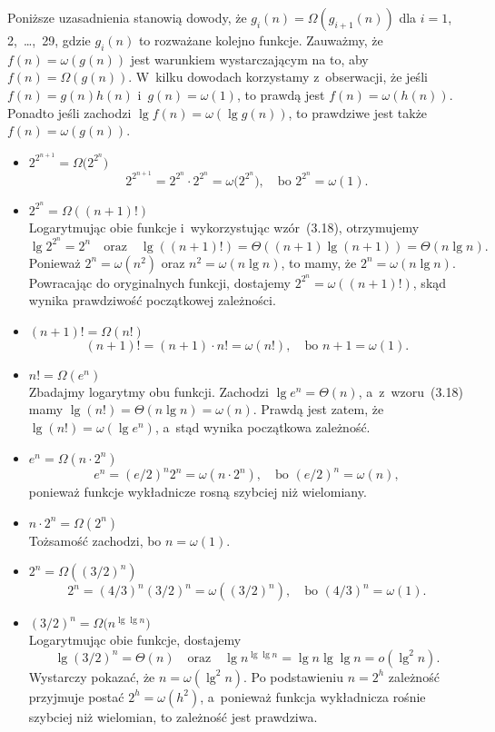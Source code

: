 
\subproblem %
Poniższe uzasadnienia stanowią dowody, że $g_i(n)=\Omega(g_{i+1}(n))$ dla $i=1$, 2,~\dots,~29, gdzie $g_i(n)$ to rozważane kolejno funkcje. Zauważmy, że $f(n)=\omega(g(n))$ jest warunkiem wystarczającym na to, aby $f(n)=\Omega(g(n))$. W~kilku dowodach korzystamy z~obserwacji, że jeśli $f(n)=g(n)h(n)$ i~$g(n)=\omega(1)$, to prawdą jest $f(n)=\omega(h(n))$. Ponadto jeśli zachodzi $\lg f(n)=\omega(\lg g(n))$, to prawdziwe jest także $f(n)=\omega(g(n))$.
\begin{itemize}
\item $2^{2^{n+1}}=\Omega\bigl(2^{2^n}\bigr)$
	\[
		2^{2^{n+1}} = 2^{2^n}\cdot2^{2^n} = \omega\bigl(2^{2^n}\bigr), \quad\text{bo $2^{2^n} = \omega(1)$}.
	\]
\item $2^{2^n}=\Omega((n+1)!)$ \\
	Logarytmując obie funkcje i~wykorzystując wzór~(3.18), otrzymujemy
	\[
		\lg 2^{2^n} = 2^n \quad\text{oraz}\quad \lg((n+1)!) = \Theta((n+1)\lg(n+1)) = \Theta(n\lg n).
	\]
	Ponieważ $2^n=\omega(n^2)$ oraz $n^2=\omega(n\lg n)$, to mamy, że $2^n=\omega(n\lg n)$. Powracając do oryginalnych funkcji, dostajemy $2^{2^n}=\omega((n+1)!)$, skąd wynika prawdziwość początkowej zależności.
\item $(n+1)!=\Omega(n!)$
	\[
		(n+1)! = (n+1)\cdot n! = \omega(n!), \quad\text{bo $n+1 = \omega(1)$}.
	\]
\item $n!=\Omega(e^n)$ \\
	Zbadajmy logarytmy obu funkcji. Zachodzi $\lg e^n=\Theta(n)$, a~z~wzoru~(3.18) mamy $\lg(n!)=\Theta(n\lg n)=\omega(n)$. Prawdą jest zatem, że $\lg(n!)=\omega(\lg e^n)$, a~stąd wynika początkowa zależność.
\item $e^n=\Omega(n\cdot2^n)$
	\[
		e^n = (e/2)^n2^n = \omega(n\cdot2^n), \quad\text{bo $(e/2)^n = \omega(n)$},
	\]
	ponieważ funkcje wykładnicze rosną szybciej niż wielomiany.
\item $n\cdot2^n=\Omega(2^n)$ \\
	Tożsamość zachodzi, bo $n=\omega(1)$.
\item $2^n=\Omega((3/2)^n)$
	\[
		2^n = (4/3)^n(3/2)^n = \omega((3/2)^n), \quad\text{bo $(4/3)^n = \omega(1)$}.
	\]
\item $(3/2)^n=\Omega\bigl(n^{\lg\lg n}\bigr)$ \\
	Logarytmując obie funkcje, dostajemy
	\[
		\lg(3/2)^n = \Theta(n) \quad\text{oraz}\quad \lg n^{\lg\lg n} = \lg n\lg\lg n = o(\lg^2n).
	\]
	Wystarczy pokazać, że $n=\omega(\lg^2n)$. Po podstawieniu $n=2^h$ zależność przyjmuje postać $2^h=\omega(h^2)$, a~ponieważ funkcja wykładnicza rośnie szybciej niż wielomian, to zależność jest prawdziwa.

\end{itemize}
